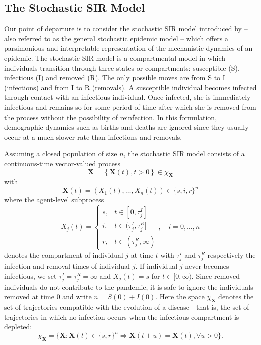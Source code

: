 \documentclass[12pt]{article}
\begin{document}
	\subsection{The Stochastic SIR Model}
	\label{sec:sir}
	Our point of departure is to consider the stochastic SIR model introduced by \cite{Bailey.1975} -- also referred to as the general stochastic epidemic model -- which offers a parsimonious and interpretable representation of the mechanistic dynamics of an epidemic. The stochastic SIR model is a compartmental model in which individuals transition through three states or compartments: susceptible (S), infectious (I) and removed (R). The only possible moves are from S to I (infections) and from I to R (removals). A susceptible individual becomes infected through contact with an infectious individual. Once infected, she is immediately infectious and remains so for some period of time after which she is removed from the process without the possibility of reinfection. In this formulation, demographic dynamics such as births and deaths are ignored since they usually occur at a much slower rate than infections and removals.
	
	Assuming a closed population of size $n$, the stochastic SIR model consists of a continuous-time vector-valued process
	\begin{equation}
		\label{eq:X}
		\mathbf{X} = \left\lbrace \mathbf{X}(t), t>0\right\rbrace \in \chi_{\mathbf{X}}
	\end{equation}
	with
	\begin{equation}
		\mathbf{X}(t) = \left(X_1(t), \dots, X_n(t)\right) \in \{s, i, r\}^n
	\end{equation}
	where the agent-level subprocess
	$$ X_j(t) = 
	\begin{cases}
		s, & t \in [0, \tau^I_j] \\
		i, & t \in (\tau^I_j, \tau^R_j] \\
		r, & t \in (\tau^R_j, \infty)
	\end{cases}
	,\quad i = 0, \dots, n
	$$
	denotes the compartment of individual $j$ at time $t$ with $\tau^I_j$ and $\tau^R_j$ respectively the infection and removal times of individual $j$. If individual $j$ never becomes infectious, we set $\tau^I_j = \tau^R_j = \infty$ and $X_j(t) = s$ for $t \in [0, \infty)$. Since removed individuals do not contribute to the pandemic, it is safe to ignore the individuals removed at time $0$ and write $n = S(0) + I(0)$. Here the space $\chi_{\mathbf{X}}$ denotes the set of trajectories compatible with the evolution of a disease---that is, the set of trajectories in which no infection occurs when the infectious compartment is depleted:
	\begin{equation}
		\label{eq:chi}
		\chi_{\mathbf{X}} = \{\mathbf{X}:\mathbf{X}(t) \in \{s,r\}^n \Rightarrow \mathbf{X}(t+u) = \mathbf{X}(t), \forall u>0 \}.
	\end{equation}
	
\end{document}
